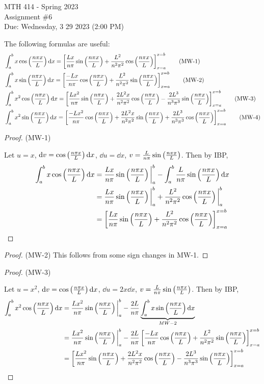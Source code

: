 \documentclass[12pt]{article}
\newcommand{\npxl}{\frac{n \pi x}{L}}
\newcommand{\onp}[1]{\frac{#1}{n \pi}}
\newcommand{\onps}[1]{\frac{#1}{n^2 \pi^2}}
\newcommand{\onpc}[1]{\frac{#1}{n^3 \pi^3}}
\newcommand{\cosp}[1]{\cos \pars{#1}}
\newcommand{\sinp}[1]{\sin \pars{#1}}
\newcommand{\nl}{\vspace{0.1in}\noindent}
\newcommand{\nnl}{\vspace{0.2in}\noindent}
\begin{document}
\pagestyle{fancy}
\fancyhf{}

\noindent MTH 414 - Spring 2023
\\Assignment \#6
\\Due: Wednesday, 3 29 2023 (2:00 PM)


\nnl The following formulas are useful:
\begin{align*}
    & \int_a^b x \cosp{\npxl} \dd x = \brac{ \frac{Lx}{n \pi} \sinp{\npxl} + \frac{L^2}{n^2 \pi^2} \cosp{\npxl}}_{x=a}^{x=b} \tag{MW-1}\\
    & \int_a^b x \sinp{\npxl} \dd x = \brac{ \frac{-Lx}{n \pi} \cosp{\npxl} + \frac{L^2}{n^2 \pi^2} \sinp{\npxl}}_{x=a}^{x=b} \tag{MW-2}\\
    & \int_a^b x^2 \cosp{\npxl} \dd x = \brac{
        \frac{Lx^2}{n \pi} \sinp{\npxl} + \frac{2L^2x}{n^2 \pi^2} \cosp{\npxl} - \frac{2L^3}{n^3 \pi^3} \sinp{\npxl}
    }_{x=a}^{x=b} \tag{MW-3}\\
    & \int_a^b x^2 \sinp{\npxl} \dd x = \brac{
        \onp{-Lx^2} \cosp{\npxl} 
        + \onps{2L^2x} \sinp{\npxl} + \onpc{2L^3} \cosp{\npxl}
    }_{x=a}^{x=b} \tag{MW-4}
\end{align*}

\begin{proof} (MW-1)
    
    \nl Let $u=x$, $\dd v = \cosp{\npxl} \dd x$, $\dd u = \dd x$, $v = \onp{L} \sinp{\npxl}$. Then by IBP, 
    \begin{align*}
        \int_a^b x \cosp{\npxl} \dd x
        &= \onp{Lx} \sinp{\npxl} \bigg|_a^b - \int_{a}^b \onp{L} \sinp{\npxl} \dd x\\
        &= \onp{Lx} \sinp{\npxl} \bigg|_a^b + \frac{L^2}{n^2 \pi^2} \cosp{\npxl}\bigg|_a^b\\
        &= \brac{ \frac{Lx}{n \pi} \sinp{\npxl} + \frac{L^2}{n^2 \pi^2} \cosp{\npxl}}_{x=a}^{x=b}
    \end{align*}
\end{proof}
\begin{proof} (MW-2)
    This follows from some sign changes in MW-1.
\end{proof}

\begin{proof} (MW-3)
    
    \nl Let $u=x^2$, $\dd v = \cosp{\npxl} \dd x$, $\dd u = 2x \dd x$, $v = \onp{L} \sinp{\npxl}$. Then by IBP, 
    \begin{align*}
        \int_a^b x^2 \cosp{\npxl} \dd x
        &= \onp{Lx^2} \sinp{\npxl} \bigg|_a^b - \onp{2L} \underbrace{\int_{a}^b x \sinp{\npxl} \dd x}_{MW-2}\\
        &= \onp{Lx^2} \sinp{\npxl} \bigg|_a^b - \onp{2L}\brac{ \frac{-Lx}{n \pi} \cosp{\npxl} + \frac{L^2}{n^2 \pi^2} \sinp{\npxl}}_{x=a}^{x=b}\\
        &= \brac{
            \frac{Lx^2}{n \pi} \sinp{\npxl} + \frac{2L^2x}{n^2 \pi^2} \cosp{\npxl} - \frac{2L^3}{n^3 \pi^3} \sinp{\npxl}
        }_{x=a}^{x=b}
    \end{align*}
\end{proof}
\end{document}
